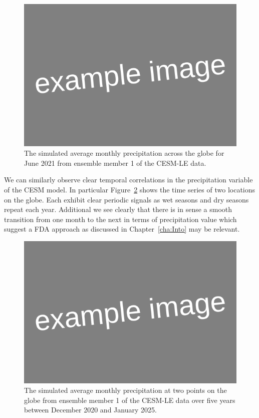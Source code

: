 \begin{figure}[htbp!] 
	\centering    
	\includegraphics[width=1.0\textwidth]{Example_image}
	\caption[Monthly precipitation for June 2021]{The simulated average monthly precipitation across the globe for June 2021 from ensemble member 1 of the CESM-LE data. }
	\label{fig:precip_june}
\end{figure}

We can similarly observe clear temporal correlations in the precipitation variable of the CESM model. In particular Figure~\ref{fig:precip_temp} shows the time series of two locations on the globe. Each exhibit clear periodic signals as wet seasons and dry seasons repeat each year. Additional we see clearly that there is in sense a smooth transition from one month to the next in terms of precipitation value which suggest a FDA approach as discussed in Chapter~\ref{cha:Into} may be relevant. 

\begin{figure}[htbp!] 
	\centering    
	\includegraphics[width=1.0\textwidth]{Example_image}
	\caption[Monthly precipitation between December 2020 and January 2025]{The simulated average monthly precipitation at two points on the globe from ensemble member 1 of the CESM-LE data over five years between December 2020 and January 2025.  }
	\label{fig:precip_temp}
\end{figure}



